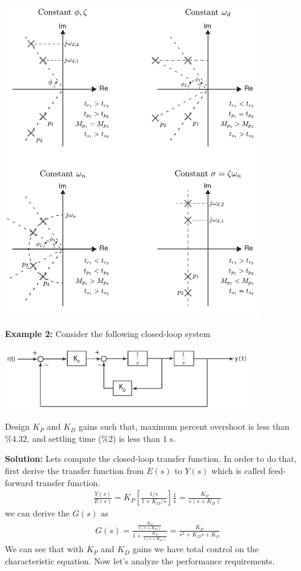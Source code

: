 \documentclass[twoside]{article}
\begin{document}
    \begin{minipage}[h]{1\linewidth}
    \begin{center}
     \includegraphics[width=0.83\textwidth]{ex}
    \end{center}
  \end{minipage}

\textbf{Example 2:} Consider the following closed-loop system

     \begin{minipage}[h]{1\linewidth}
    \begin{center}
     \includegraphics[width=0.8\textwidth]{example}
    \end{center}
  \end{minipage}

Design $K_P$ and $K_D$ gains such that, maximum percent overshoot is less than $\%4.32$,
and settling time ($\%2$) is less than $1$ s.

\textbf{Solution:} Lets compute the closed-loop transfer function. In order to do that, first derive the transfer
function from $E(s)$ to $Y(s)$ which is called feed-forward transfer function.
%
\begin{align*}
 \frac{Y(s)}{E(s)} = K_P \left[ \frac{1/s}{1 + K_D/s} \right] \frac{1}{s} = \frac{K_P}{s (s + K_D)}
\end{align*}
%
we can derive the $G(s)$ as
%
\begin{align*}
	G(s) = \frac{ \frac{K_P}{s (s + K_D)}}{1 +  \frac{K_P}{s (s + K_D)}} = \frac{K_P}{s^2 + K_D s + K_P}
\end{align*}
%
We can see that with $K_P$ and $K_D$ gains we have total control on the characteristic equation. 
Now let's analyze the performance requirements.
\end{document}
